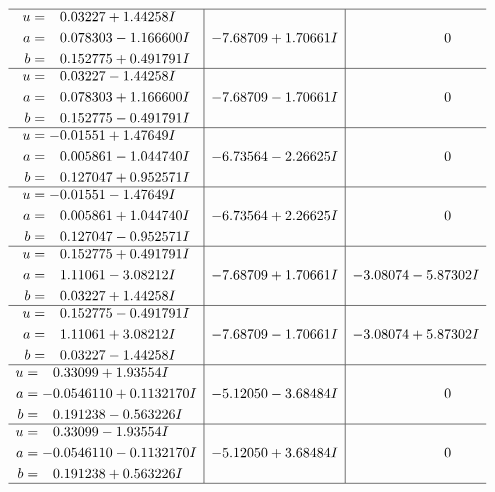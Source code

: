 \documentclass[1p]{elsarticle_modified}
\theoremstyle{definition}
\begin{document}
$$\begin{array}{c|c|c}
 \hline 
\begin{aligned}
u &= \phantom{-}0.03227 + 1.44258 I \\
a &= \phantom{-}0.078303 - 1.166600 I \\
b &= \phantom{-}0.152775 + 0.491791 I\end{aligned}
 & -7.68709 + 1.70661 I & \phantom{-0.000000 } 0 \\ \hline\begin{aligned}
u &= \phantom{-}0.03227 - 1.44258 I \\
a &= \phantom{-}0.078303 + 1.166600 I \\
b &= \phantom{-}0.152775 - 0.491791 I\end{aligned}
 & -7.68709 - 1.70661 I & \phantom{-0.000000 } 0 \\ \hline\begin{aligned}
u &= -0.01551 + 1.47649 I \\
a &= \phantom{-}0.005861 - 1.044740 I \\
b &= \phantom{-}0.127047 + 0.952571 I\end{aligned}
 & -6.73564 - 2.26625 I & \phantom{-0.000000 } 0 \\ \hline\begin{aligned}
u &= -0.01551 - 1.47649 I \\
a &= \phantom{-}0.005861 + 1.044740 I \\
b &= \phantom{-}0.127047 - 0.952571 I\end{aligned}
 & -6.73564 + 2.26625 I & \phantom{-0.000000 } 0 \\ \hline\begin{aligned}
u &= \phantom{-}0.152775 + 0.491791 I \\
a &= \phantom{-}1.11061 - 3.08212 I \\
b &= \phantom{-}0.03227 + 1.44258 I\end{aligned}
 & -7.68709 + 1.70661 I & -3.08074 - 5.87302 I \\ \hline\begin{aligned}
u &= \phantom{-}0.152775 - 0.491791 I \\
a &= \phantom{-}1.11061 + 3.08212 I \\
b &= \phantom{-}0.03227 - 1.44258 I\end{aligned}
 & -7.68709 - 1.70661 I & -3.08074 + 5.87302 I \\ \hline\begin{aligned}
u &= \phantom{-}0.33099 + 1.93554 I \\
a &= -0.0546110 + 0.1132170 I \\
b &= \phantom{-}0.191238 - 0.563226 I\end{aligned}
 & -5.12050 - 3.68484 I & \phantom{-0.000000 } 0 \\ \hline\begin{aligned}
u &= \phantom{-}0.33099 - 1.93554 I \\
a &= -0.0546110 - 0.1132170 I \\
b &= \phantom{-}0.191238 + 0.563226 I\end{aligned}
 & -5.12050 + 3.68484 I & \phantom{-0.000000 } 0\\
 \hline 
 \end{array}$$\newpage\newpage\renewcommand{\arraystretch}{1}
\end{document}
